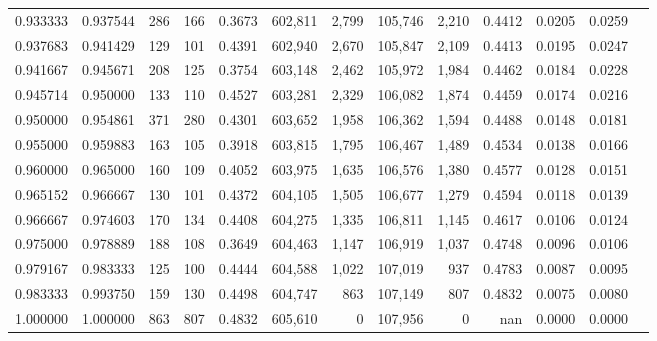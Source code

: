 \begin{tabular}{rrrrrrrrrrrrr}
0.933333 & 0.937544 &    286 &   166 &                                     0.3673 & 602,811 &   2,799 & 105,746 &   2,210 & 0.4412 & 0.0205 & 0.0259 \\
0.937683 & 0.941429 &    129 &   101 &                                     0.4391 & 602,940 &   2,670 & 105,847 &   2,109 & 0.4413 & 0.0195 & 0.0247 \\
0.941667 & 0.945671 &    208 &   125 &                                     0.3754 & 603,148 &   2,462 & 105,972 &   1,984 & 0.4462 & 0.0184 & 0.0228 \\
0.945714 & 0.950000 &    133 &   110 &                                     0.4527 & 603,281 &   2,329 & 106,082 &   1,874 & 0.4459 & 0.0174 & 0.0216 \\
0.950000 & 0.954861 &    371 &   280 &                                     0.4301 & 603,652 &   1,958 & 106,362 &   1,594 & 0.4488 & 0.0148 & 0.0181 \\
0.955000 & 0.959883 &    163 &   105 &                                     0.3918 & 603,815 &   1,795 & 106,467 &   1,489 & 0.4534 & 0.0138 & 0.0166 \\
0.960000 & 0.965000 &    160 &   109 &                                     0.4052 & 603,975 &   1,635 & 106,576 &   1,380 & 0.4577 & 0.0128 & 0.0151 \\
0.965152 & 0.966667 &    130 &   101 &                                     0.4372 & 604,105 &   1,505 & 106,677 &   1,279 & 0.4594 & 0.0118 & 0.0139 \\
0.966667 & 0.974603 &    170 &   134 &                                     0.4408 & 604,275 &   1,335 & 106,811 &   1,145 & 0.4617 & 0.0106 & 0.0124 \\
0.975000 & 0.978889 &    188 &   108 &                                     0.3649 & 604,463 &   1,147 & 106,919 &   1,037 & 0.4748 & 0.0096 & 0.0106 \\
0.979167 & 0.983333 &    125 &   100 &                                     0.4444 & 604,588 &   1,022 & 107,019 &     937 & 0.4783 & 0.0087 & 0.0095 \\
0.983333 & 0.993750 &    159 &   130 &                                     0.4498 & 604,747 &     863 & 107,149 &     807 & 0.4832 & 0.0075 & 0.0080 \\
1.000000 & 1.000000 &    863 &   807 &                                     0.4832 & 605,610 &       0 & 107,956 &       0 &    nan & 0.0000 & 0.0000 \\
\bottomrule
\end{tabular}
